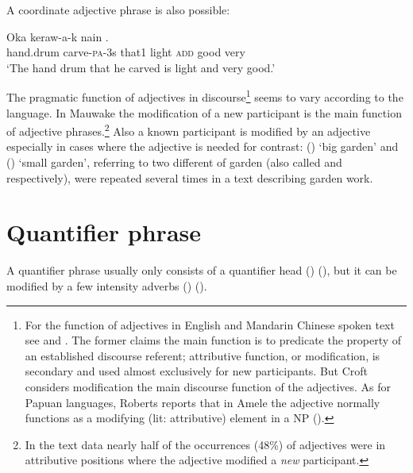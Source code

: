 A coordinate adjective phrase is also possible:

\ea%
\label{ex:x891}
\gll Oka  keraw-a-k  nain     . \\
    hand.drum  carve-\textsc{pa}-3s  that1  light  \textsc{add}  good  very  \\
\glt`The hand drum that he carved is light and very good.'
\z

  



The pragmatic function of adjectives in discourse\footnote{For the function of adjectives in English and Mandarin Chinese spoken text see \citet{Thompson1988} and \citet{Croft1991}. The former claims the main function is to predicate the property of an established discourse referent; attributive function, or modification, is secondary and used almost exclusively for new participants. But Croft considers modification the main discourse function of the adjectives.  As for Papuan languages, Roberts reports that in Amele the adjective normally functions as a modifying (lit: attributive) element in a NP (\citeyear[318]{Roberts1987}).} seems to vary according to the language. In Mauwake the modification of a new participant is the main function of adjective phrases.\footnote{In the text data nearly half of the occurrences (48\%) of adjectives were in attributive positions where the adjective modified a \textit{new} participant.} Also a known participant is modified by an adjective especially in cases where the adjective is needed for contrast: ()  `big garden' and () \textstyleEmphasizedWords{} `small garden', referring to two different  of garden (also called  and  respectively), were repeated several times in a text describing garden work. 

\section{Quantifier phrase}
{}
A quantifier phrase usually only consists of a quantifier head () (), but it can be modified by a few intensity adverbs () (). 

